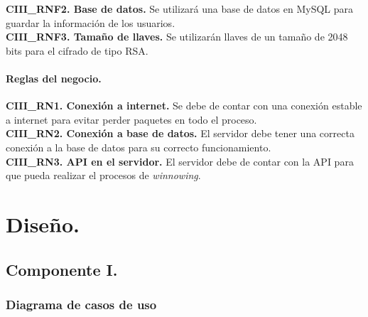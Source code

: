 \documentclass[12pt, a4paper, titlepage]{report}
\begin{document}
	                \textbf{CIII\_RNF2. Base de datos.} Se utilizará una base de datos en MySQL para guardar la información de los usuarios.\\
	                
	                \textbf{CIII\_RNF3. Tamaño de llaves.} Se utilizarán llaves de un tamaño de 2048 bits para el cifrado de tipo RSA.\\
	                
	       
	            \subsubsection{Reglas del negocio.}
    	            \textbf{CIII\_RN1. Conexión a internet.} Se debe de contar con una conexión estable a internet para evitar perder paquetes en todo el proceso.\\
    	            
    	            \textbf{CIII\_RN2. Conexión a base de datos.} El servidor debe tener una correcta conexión a la base de datos para su correcto funcionamiento.\\
    	            
    	            \textbf{CIII\_RN3. API en el servidor.} El servidor debe de contar con la API para que pueda realizar el procesos de \textit{winnowing}.
	
	
	
	
	
	
	
	    
	\chapter{\textcolor{azulescom}{Diseño.}}
			
		\section{Componente I.}
		 
		    \subsection{Diagrama de casos de uso}
			    
\end{document}
